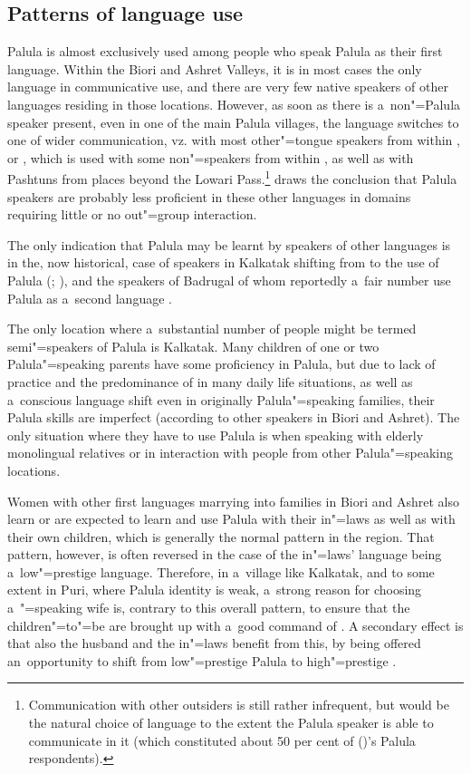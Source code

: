 \subsection{Patterns of language use}
\label{subsec:1-3-4}

Palula is almost exclusively used among people who speak Palula as their first language. Within the Biori and Ashret Valleys, it is in most cases the only language in communicative use, and there are very few native speakers of other languages residing in those locations. However, as soon as there is a~non"=Palula speaker present, even in one of the main Palula villages, the language switches to one of wider communication, vz. \iliKhowar with most other"=tongue speakers from within \iliChitral, or \iliPashto, which is used with some non"=\iliKhowar speakers from within \iliChitral, as well as with Pashtuns from places beyond the Lowari Pass.\footnote{Communication with other outsiders is still rather infrequent, but \iliUrdu would be the natural choice of language to the extent the Palula speaker is able to communicate in it (which constituted about 50 per cent of \citeauthor{decker1992a} (\citeyear{decker1992a})'s Palula respondents).} \citet{decker1992a} draws the conclusion that Palula speakers are probably less proficient in these other languages in domains requiring little or no out"=group interaction. 


The only indication that Palula may be learnt by speakers of other languages is in the, now historical, case of \iliKalasha speakers in Kalkatak shifting from \iliKalasha to the use of Palula (\citealt[55, 79]{decker1992b}; \citealt[5]{akhunzadaliljegren2009}), and the \iliShekhani speakers of Badrugal of whom reportedly a~fair number use Palula as a~second language \citep[59]{decker1992b}. 


The only location where a~substantial number of people might be termed semi"=speakers of Palula is Kalkatak. Many children of one or two Palula"=speaking parents have some proficiency in Palula, but due to lack of practice and the predominance of \iliKhowar in many daily life situations, as well as a~conscious language shift even in originally Palula"=speaking families, their Palula skills are imperfect (according to other speakers in Biori and Ashret). The only situation where they have to use Palula is when speaking with elderly monolingual relatives or in interaction with people from other Palula"=speaking locations.


Women with other first languages marrying into families in Biori and Ashret also learn or are expected to learn and use Palula with their in"=laws as well as with their own children, which is generally the normal pattern in the region. That pattern, however, is often reversed in the case of the in"=laws' language being a~low"=prestige language. Therefore, in a~village like Kalkatak, and to some extent in Puri, where Palula identity is weak, a~strong reason for choosing a~\iliKhowar"=speaking wife is, contrary to this overall pattern, to ensure that the children"=to"=be are brought up with a~good command of \iliKhowar. A secondary effect is that also the husband and the in"=laws benefit from this, by being offered an~opportunity to shift from low"=prestige Palula to high"=prestige \iliKhowar.


